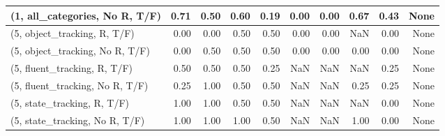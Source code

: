 \begin{table*}[h!]
\begin{adjustbox}{width=2\columnwidth,center}
\begin{tabular}{lrrr|rrr|rrr}
(1, all\_categories, No R, T/F)       &                      0.71 &                  0.50 &                      0.60 &                          0.19 &                      0.00 &                          0.00 &                                   0.67 &                               0.43 &                                  None \\



\midrule
(5, object\_tracking, R, T/F)         &                      0.00 &                  0.00 &                      0.50 &                          0.50 &                      0.00 &                          0.00 &                                    NaN &                               0.00 &                                  None \\
(5, object\_tracking, No R, T/F)      &                      0.00 &                  0.50 &                      0.50 &                          0.50 &                      0.00 &                          0.00 &                                   0.00 &                               0.00 &                                  None \\
(5, fluent\_tracking, R, T/F)         &                      0.50 &                  0.50 &                      0.50 &                          0.25 &                       NaN &                           NaN &                                    NaN &                               0.25 &                                  None \\
(5, fluent\_tracking, No R, T/F)      &                      0.25 &                  1.00 &                      0.50 &                          0.50 &                       NaN &                           NaN &                                   0.25 &                               0.25 &                                  None \\
(5, state\_tracking, R, T/F)          &                      1.00 &                  1.00 &                      0.50 &                          0.50 &                       NaN &                           NaN &                                    NaN &                               0.00 &                                  None \\
(5, state\_tracking, No R, T/F)       &                      1.00 &                  1.00 &                      1.00 &                          0.50 &                       NaN &                           NaN &                                   1.00 &                               0.00 &                                  None \\

\end{tabular}
\end{adjustbox}
\end{table*}

